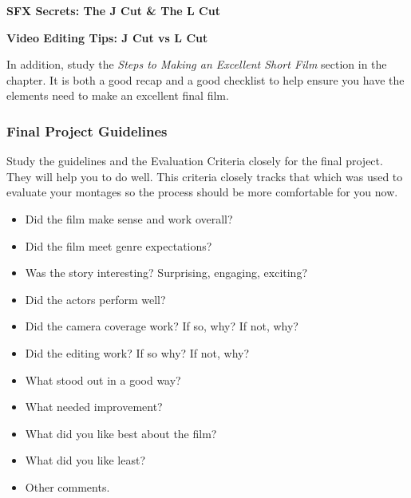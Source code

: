 \documentclass[
]{book}
\providecommand{\tightlist}{%
  \setlength{\itemsep}{0pt}\setlength{\parskip}{0pt}}
\begin{document}
\begin{reflect}
\textbf{SFX Secrets: The J Cut \& The L Cut}

\textbf{Video Editing Tips: J Cut vs L Cut}

In addition, study the \emph{Steps to Making an Excellent Short Film} section in the chapter. It is both a good recap and a good checklist to help ensure you have the elements need to make an excellent final film.

\hypertarget{final-project-guidelines}{%
\subsubsection*{Final Project Guidelines}\label{final-project-guidelines}}

Study the guidelines and the Evaluation Criteria closely for the final project. They will help you to do well. This criteria closely tracks that which was used to evaluate your montages so the process should be more comfortable for you now.

\begin{itemize}
\tightlist
\item
  Did the film make sense and work overall?\\
\item
  Did the film meet genre expectations?\\
\item
  Was the story interesting? Surprising, engaging, exciting?\\
\item
  Did the actors perform well?\\
\item
  Did the camera coverage work? If so, why? If not, why?\\
\item
  Did the editing work? If so why? If not, why?\\
\item
  What stood out in a good way?\\
\item
  What needed improvement?\\
\item
  What did you like best about the film?\\
\item
  What did you like least?\\
\item
  Other comments.
\end{itemize}
\end{reflect}
\end{document}
